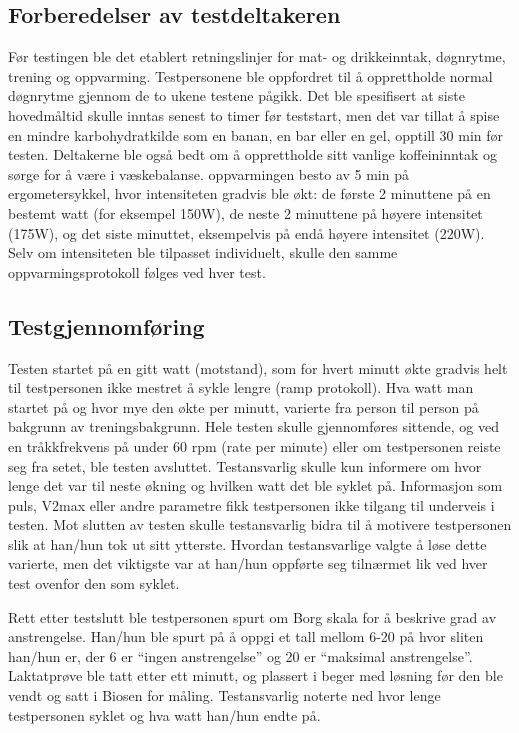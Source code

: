 \documentclass[
  letterpaper,
  DIV=11,
  numbers=noendperiod]{scrreprt}
\begin{document}
\subsection{Forberedelser av
testdeltakeren}\label{forberedelser-av-testdeltakeren}

Før testingen ble det etablert retningslinjer for mat- og drikkeinntak,
døgnrytme, trening og oppvarming. Testpersonene ble oppfordret til å
opprettholde normal døgnrytme gjennom de to ukene testene pågikk. Det
ble spesifisert at siste hovedmåltid skulle inntas senest to timer før
teststart, men det var tillat å spise en mindre karbohydratkilde som en
banan, en bar eller en gel, opptill 30 min før testen. Deltakerne ble
også bedt om å opprettholde sitt vanlige koffeininntak og sørge for å
være i væskebalanse. oppvarmingen besto av 5 min på ergometersykkel,
hvor intensiteten gradvis ble økt: de første 2 minuttene på en bestemt
watt (for eksempel 150W), de neste 2 minuttene på høyere intensitet
(175W), og det siste minuttet, eksempelvis på endå høyere intensitet
(220W). Selv om intensiteten ble tilpasset individuelt, skulle den samme
oppvarmingsprotokoll følges ved hver test.

\subsection{Testgjennomføring}\label{testgjennomfuxf8ring}

Testen startet på en gitt watt (motstand), som for hvert minutt økte
gradvis helt til testpersonen ikke mestret å sykle lengre (ramp
protokoll). Hva watt man startet på og hvor mye den økte per minutt,
varierte fra person til person på bakgrunn av treningsbakgrunn. Hele
testen skulle gjennomføres sittende, og ved en tråkkfrekvens på under 60
rpm (rate per minute) eller om testpersonen reiste seg fra setet, ble
testen avsluttet. Testansvarlig skulle kun informere om hvor lenge det
var til neste økning og hvilken watt det ble syklet på. Informasjon som
puls, V2max eller andre parametre fikk testpersonen ikke tilgang til
underveis i testen. Mot slutten av testen skulle testansvarlig bidra til
å motivere testpersonen slik at han/hun tok ut sitt ytterste. Hvordan
testansvarlige valgte å løse dette varierte, men det viktigste var at
han/hun oppførte seg tilnærmet lik ved hver test ovenfor den som syklet.

Rett etter testslutt ble testpersonen spurt om Borg skala for å beskrive
grad av anstrengelse. Han/hun ble spurt på å oppgi et tall mellom 6-20
på hvor sliten han/hun er, der 6 er ``ingen anstrengelse'' og 20 er
``maksimal anstrengelse''. Laktatprøve ble tatt etter ett minutt, og
plassert i beger med løsning før den ble vendt og satt i Biosen for
måling. Testansvarlig noterte ned hvor lenge testpersonen syklet og hva
watt han/hun endte på.
\end{document}
